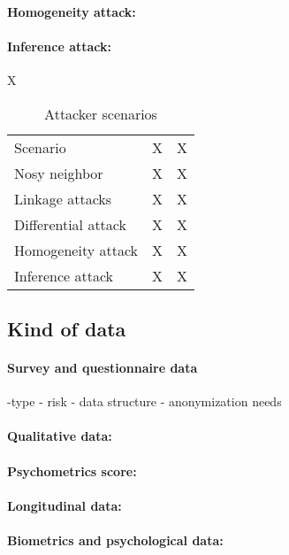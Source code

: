 \documentclass{article}
\begin{document}
\paragraph{Homogeneity attack:}

\paragraph{Inference attack:}
X

\begin{table}[H]
    \centering
    \begin{tabular}{lcc}
        Scenario & X & X \\
        Nosy neighbor & X & X \\
        Linkage attacks & X & X \\
        Differential attack & X & X \\
        Homogeneity attack & X & X \\
        Inference attack & X & X \\
    \end{tabular}
    \caption{Attacker scenarios}
    \label{tab:tab1}
\end{table}

\subsection{Kind of data}

\paragraph{Survey and questionnaire data}
-type
- risk
- data structure
- anonymization needs

\paragraph{Qualitative data:}

\paragraph{Psychometrics score:}

\paragraph{Longitudinal data:}

\paragraph{Biometrics and psychological data:}
\end{document}
